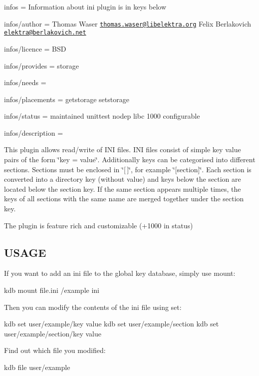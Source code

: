 
\begin{DoxyItemize}
\item infos = Information about ini plugin is in keys below
\item infos/author = Thomas Waser \href{mailto:thomas.waser@libelektra.org}{\tt thomas.\+waser@libelektra.\+org} Felix Berlakovich \href{mailto:elektra@berlakovich.net}{\tt elektra@berlakovich.\+net}
\item infos/licence = B\+S\+D
\item infos/provides = storage
\item infos/needs =
\item infos/placements = getstorage setstorage
\item infos/status = maintained unittest nodep libc 1000 configurable
\item infos/description =
\end{DoxyItemize}

This plugin allows read/write of I\+N\+I files. I\+N\+I files consist of simple key value pairs of the form \char`\"{}key = value\char`\"{}. Additionally keys can be categorised into different sections. Sections must be enclosed in \char`\"{}\mbox{[}$\,$\mbox{]}\char`\"{}, for example \char`\"{}\mbox{[}section\mbox{]}\char`\"{}. Each section is converted into a directory key (without value) and keys below the section are located below the section key. If the same section appears multiple times, the keys of all sections with the same name are merged together under the section key.

The plugin is feature rich and customizable (+1000 in status)

\subsection*{U\+S\+A\+G\+E}

If you want to add an ini file to the global key database, simply use mount\+: \begin{DoxyVerb}kdb mount file.ini /example ini
\end{DoxyVerb}


Then you can modify the contents of the ini file using set\+: \begin{DoxyVerb}kdb set user/example/key value
kdb set user/example/section
kdb set user/example/section/key value
\end{DoxyVerb}


Find out which file you modified\+: \begin{DoxyVerb}kdb file user/example
\end{DoxyVerb}


